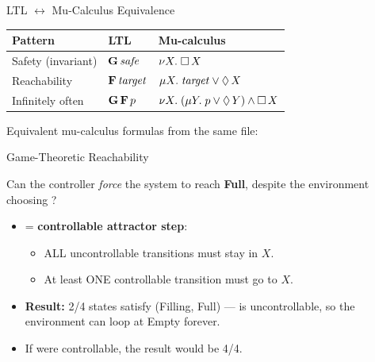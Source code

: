 \begin{frame}[fragile]{LTL $\leftrightarrow$ Mu-Calculus Equivalence}

\begin{center}
\begin{tabular}{@{}lll@{}}
  \toprule
  \textbf{Pattern} & \textbf{LTL} & \textbf{Mu-calculus} \\
  \midrule
  Safety (invariant)     & $\mathbf{G}\,\mathit{safe}$
    & $\nu X.\; \square\, X$ \\[4pt]
  Reachability           & $\mathbf{F}\,\mathit{target}$
    & $\mu X.\; \mathit{target} \lor \lozenge\, X$ \\[4pt]
  Infinitely often       & $\mathbf{G}\,\mathbf{F}\, p$
    & $\nu X.\; (\mu Y.\; p \lor \lozenge\, Y) \land \square\, X$ \\
  \bottomrule
\end{tabular}
\end{center}

\vspace{0.5em}
Equivalent mu-calculus formulas from the same file:



\end{frame}

\begin{frame}[fragile]{Game-Theoretic Reachability}

Can the controller \emph{force} the system to reach \textbf{Full},
despite the environment choosing ?



\medskip
\begin{itemize}
  \item {} = \textbf{controllable attractor step}:
    \begin{itemize}
      \item ALL uncontrollable transitions must stay in $X$.
      \item At least ONE controllable transition must go to $X$.
    \end{itemize}
  \item \textbf{Result:} 2/4 states satisfy (Filling, Full) ---
         is uncontrollable, so the environment can loop at Empty forever.
  \item If  were controllable, the result would be 4/4.
\end{itemize}

\end{frame}

